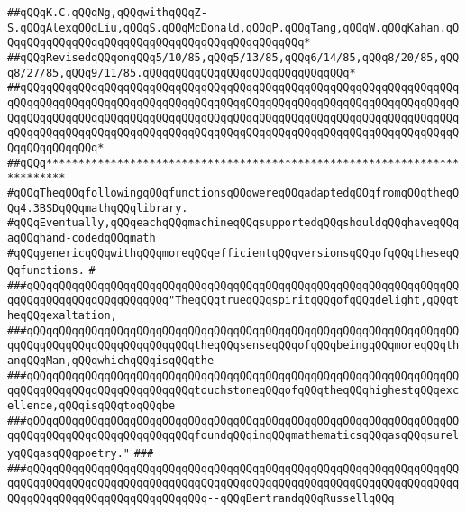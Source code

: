 \verb|##qQQqK.C.qQQqNg,qQQqwithqQQqZ-S.qQQqAlexqQQqLiu,qQQqS.qQQqMcDonald,qQQqP.qQQqTang,qQQqW.qQQqKahan.qQQqqQQqqQQqqQQqqQQqqQQqqQQqqQQqqQQqqQQqqQQqqQQq*|\newline
\verb|##qQQqRevisedqQQqonqQQq5/10/85,qQQq5/13/85,qQQq6/14/85,qQQq8/20/85,qQQq8/27/85,qQQq9/11/85.qQQqqQQqqQQqqQQqqQQqqQQqqQQqqQQq*|\newline
\verb|##qQQqqQQqqQQqqQQqqQQqqQQqqQQqqQQqqQQqqQQqqQQqqQQqqQQqqQQqqQQqqQQqqQQqqQQqqQQqqQQqqQQqqQQqqQQqqQQqqQQqqQQqqQQqqQQqqQQqqQQqqQQqqQQqqQQqqQQqqQQqqQQqqQQqqQQqqQQqqQQqqQQqqQQqqQQqqQQqqQQqqQQqqQQqqQQqqQQqqQQqqQQqqQQqqQQqqQQqqQQqqQQqqQQqqQQqqQQqqQQqqQQqqQQqqQQqqQQqqQQqqQQqqQQqqQQqqQQqqQQqqQQqqQQqqQQq*|\newline
\verb|##qQQq*************************************************************************|\newline
\newline
\newline
\verb|#qQQqTheqQQqfollowingqQQqfunctionsqQQqwereqQQqadaptedqQQqfromqQQqtheqQQq4.3BSDqQQqmathqQQqlibrary.|\newline
\verb|#qQQqEventually,qQQqeachqQQqmachineqQQqsupportedqQQqshouldqQQqhaveqQQqaqQQqhand-codedqQQqmath|\newline
\verb|#qQQqgenericqQQqwithqQQqmoreqQQqefficientqQQqversionsqQQqofqQQqtheseqQQqfunctions.|\newline
\verb|#|\newline
\newline
\verb|###qQQqqQQqqQQqqQQqqQQqqQQqqQQqqQQqqQQqqQQqqQQqqQQqqQQqqQQqqQQqqQQqqQQqqQQqqQQqqQQqqQQqqQQqqQQq"TheqQQqtrueqQQqspiritqQQqofqQQqdelight,qQQqtheqQQqexaltation,|\newline
\verb|###qQQqqQQqqQQqqQQqqQQqqQQqqQQqqQQqqQQqqQQqqQQqqQQqqQQqqQQqqQQqqQQqqQQqqQQqqQQqqQQqqQQqqQQqqQQqqQQqtheqQQqsenseqQQqofqQQqbeingqQQqmoreqQQqthanqQQqMan,qQQqwhichqQQqisqQQqthe|\newline
\verb|###qQQqqQQqqQQqqQQqqQQqqQQqqQQqqQQqqQQqqQQqqQQqqQQqqQQqqQQqqQQqqQQqqQQqqQQqqQQqqQQqqQQqqQQqqQQqqQQqtouchstoneqQQqofqQQqtheqQQqhighestqQQqexcellence,qQQqisqQQqtoqQQqbe|\newline
\verb|###qQQqqQQqqQQqqQQqqQQqqQQqqQQqqQQqqQQqqQQqqQQqqQQqqQQqqQQqqQQqqQQqqQQqqQQqqQQqqQQqqQQqqQQqqQQqqQQqfoundqQQqinqQQqmathematicsqQQqasqQQqsurelyqQQqasqQQqpoetry."|\newline
\verb|###|\newline
\verb|###qQQqqQQqqQQqqQQqqQQqqQQqqQQqqQQqqQQqqQQqqQQqqQQqqQQqqQQqqQQqqQQqqQQqqQQqqQQqqQQqqQQqqQQqqQQqqQQqqQQqqQQqqQQqqQQqqQQqqQQqqQQqqQQqqQQqqQQqqQQqqQQqqQQqqQQqqQQqqQQqqQQqqQQq--qQQqBertrandqQQqRussellqQQq|\newline
